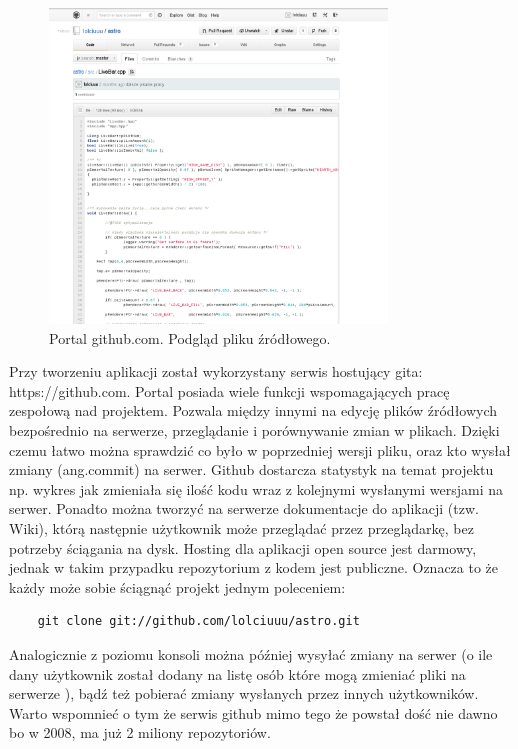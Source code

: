 \begin{figure}[h]
    \centering
    \includegraphics[width=0.8\textwidth,natwidth=490,natheight=142]{./Pictures/git.png}
    \caption{Portal github.com. Podgląd pliku źródłowego. }
\end{figure}

Przy tworzeniu aplikacji został wykorzystany serwis hostujący gita: https://github.com. Portal posiada wiele funkcji wspomagających pracę zespołową nad projektem. Pozwala między innymi na edycję plików źródłowych bezpośrednio na serwerze, przeglądanie i porównywanie zmian w plikach. Dzięki czemu łatwo można sprawdzić co było w poprzedniej wersji pliku, oraz kto wysłał zmiany (ang.commit) na serwer. Github dostarcza statystyk na temat projektu np. wykres jak zmieniała się ilość kodu wraz z kolejnymi wysłanymi wersjami na serwer. Ponadto można tworzyć na serwerze dokumentacje do aplikacji (tzw. Wiki), którą następnie użytkownik może przeglądać przez przeglądarkę, bez potrzeby ściągania na dysk. Hosting dla aplikacji open source jest darmowy, jednak w takim przypadku repozytorium z kodem jest publiczne. Oznacza to że każdy może sobie ściągnąć projekt jednym poleceniem:

\begin{verbatim}
	git clone git://github.com/lolciuuu/astro.git
\end{verbatim}

Analogicznie z poziomu konsoli można później wysyłać zmiany na serwer (o ile dany użytkownik został dodany na listę osób które mogą zmieniać pliki na serwerze ), bądź też pobierać zmiany wysłanych przez innych użytkowników. Warto wspomnieć o tym że serwis github mimo tego że powstał dość nie dawno bo w 2008, ma już 2 miliony repozytoriów. 

